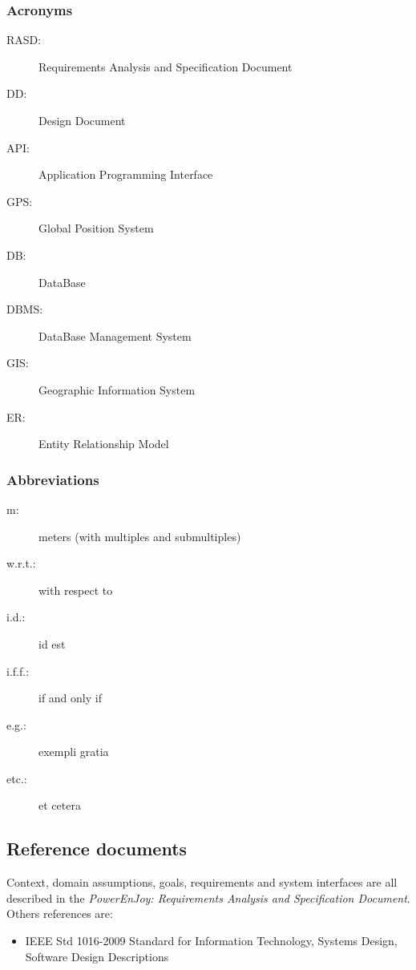 \subsubsection{Acronyms}
	\begin{description}
		\item [RASD:] Requirements Analysis and Specification Document
		\item [DD:] Design Document
		\item [API:] Application Programming Interface
		\item [GPS:] Global Position System
		\item [DB:] DataBase
		\item [DBMS:] DataBase Management System
		\item [GIS:] Geographic Information System
		\item [ER:] Entity Relationship Model
	\end{description}
\subsubsection{Abbreviations}
	\begin{description}
		\item [m:] meters (with multiples and submultiples)
		\item [w.r.t.:] with respect to
		\item [i.d.:] id est
		\item [i.f.f.:] if and only if
		\item [e.g.:] exempli gratia
		\item [etc.:] et cetera
	\end{description}

\subsection{Reference documents}
Context, domain assumptions, goals, requirements and system interfaces are all described in the \emph{PowerEnJoy: Requirements Analysis and Specification Document}.\cite{RASD}\\
Others references are:
\begin{itemize}
	\item IEEE Std 1016-2009 Standard for Information Technology, Systems Design, Software Design Descriptions
\end{itemize}

